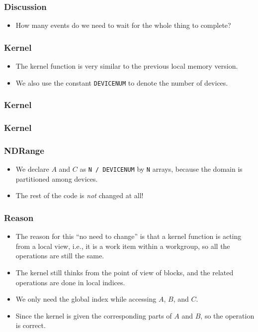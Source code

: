 \documentclass{beamer}
\begin{document}
\begin{frame}
  \frametitle{Discussion}
  \begin{itemize}
    \item How many events do we need to wait for the whole thing to
      complete?
  \end{itemize}
\end{frame}

\begin{frame}
  \frametitle{Kernel}
  \begin{itemize}
    \item The kernel function is very similar to the previous local
      memory version.
    \item We also use the constant {\tt DEVICENUM} to denote the
      number of devices.
  \end{itemize}
\end{frame}
  
\begin{frame}
  \frametitle{Kernel}
\end{frame}

\begin{frame}
  \frametitle{Kernel}
\end{frame}

\begin{frame}
  \frametitle{NDRange}
  \begin{itemize}
    \item We declare $A$ and $C$ as {\tt N / DEVICENUM} by {\tt N}
      arrays, because the domain is partitioned among devices.
    \item The rest of the code is {\em not} changed at all!
  \end{itemize}
\end{frame}

\begin{frame}
  \frametitle{Reason}
  \begin{itemize}
  \item The reason for this ``no need to change'' is that a kernel
    function is acting from a local view, i.e., it is a work item
    within a workgroup, so all the operations are still the same.
  \item The kernel still thinks from the point of view of blocks, and
    the related operations are done in local indices.
  \item We only need the global index while accessing $A$, $B$, and
    $C$.
  \item Since the kernel is given the corresponding parts of $A$ and
    $B$, so the operation is correct.
  \end{itemize}
\end{frame}
\end{document}
